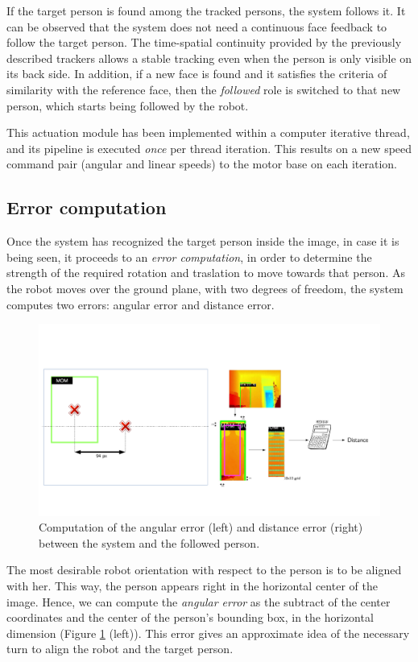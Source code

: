 If the target person is found among the tracked persons, the system follows it. It can be observed that the system does not need a continuous face feedback to follow the target person. The time-spatial continuity provided by the previously described trackers allows a stable tracking even when the person is only visible on its back side. In addition, if a new face is found and it satisfies the criteria of similarity with the reference face, then the \emph{followed} role is switched to that new person, which starts being followed by the robot.

This actuation module has been implemented within a computer iterative thread, and its pipeline is executed \emph{once} per thread iteration. This results on a new speed command pair (angular and linear speeds) to the motor base on each iteration.

\subsection{Error computation}

Once the system has recognized the target person inside the image, in case it is being seen, it proceeds to an \emph{error computation}, in order to determine the strength of the required rotation and traslation to move towards that person. As the robot moves over the ground plane, with two degrees of freedom, the system computes two errors: angular error and distance error.

\begin{figure}
  \includegraphics[width=13cm]{images/errors}
  \caption{Computation of the angular error (left) and distance error (right) between the system and the followed person.}
  \label{fig:h_error}
\end{figure}

The most desirable robot orientation with respect to the person is to be aligned with her. This way, the person appears right in the horizontal center of the image. Hence, we can compute the \emph{angular error} as the subtract of the center coordinates and the center of the person's bounding box, in the horizontal dimension (Figure \ref{fig:h_error} (left)). This error gives an approximate idea of the necessary turn to align the robot and the target person.
	
